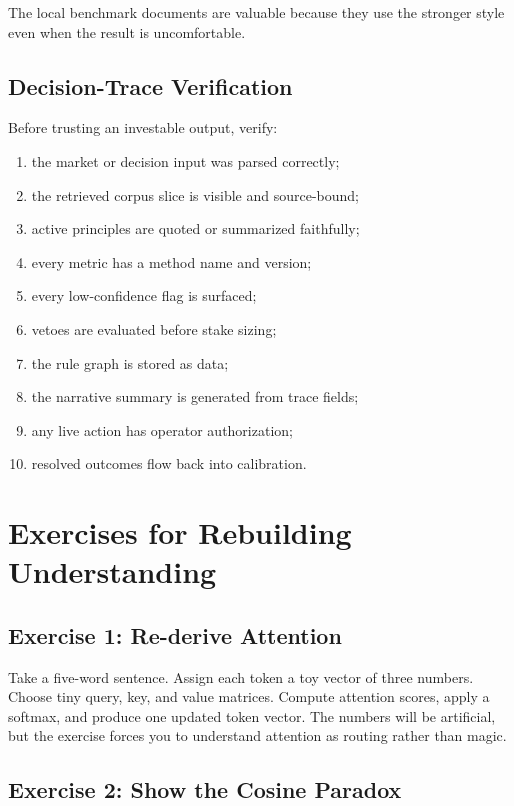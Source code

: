 \documentclass[11pt]{article}
\begin{document}
The local benchmark documents are valuable because they use the stronger style
even when the result is uncomfortable.

\subsection{Decision-Trace Verification}

Before trusting an investable output, verify:

\begin{enumerate}
\item the market or decision input was parsed correctly;
\item the retrieved corpus slice is visible and source-bound;
\item active principles are quoted or summarized faithfully;
\item every metric has a method name and version;
\item every low-confidence flag is surfaced;
\item vetoes are evaluated before stake sizing;
\item the rule graph is stored as data;
\item the narrative summary is generated from trace fields;
\item any live action has operator authorization;
\item resolved outcomes flow back into calibration.
\end{enumerate}

\section{Exercises for Rebuilding Understanding}

\subsection{Exercise 1: Re-derive Attention}

Take a five-word sentence. Assign each token a toy vector of three numbers.
Choose tiny query, key, and value matrices. Compute attention scores, apply a
softmax, and produce one updated token vector. The numbers will be artificial,
but the exercise forces you to understand attention as routing rather than
magic.

\subsection{Exercise 2: Show the Cosine Paradox}
\end{document}
